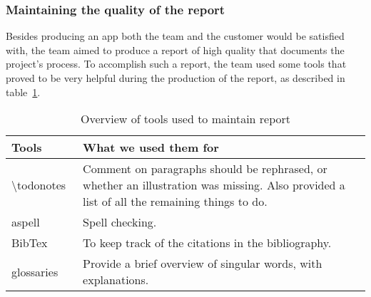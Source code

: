 \subsubsection{Maintaining the quality of the report}
Besides producing an app both the team and the customer would be satisfied with, the team aimed to produce a report of high quality that documents the project's process. To accomplish such a report, the team used some tools that proved to be very helpful during the production of the report, as described in table~\ref{tab:reportTools}.

\begin{table}[H]
\begin{tabular}{|l|p{13cm}|}
\hline
\textbf{Tools} & \textbf{What we used them for}\\\hline
\textbackslash todonotes~\cite{todo}&Comment on paragraphs should be rephrased, or whether an illustration was missing. Also provided a list of all the remaining things to do.\\\hline
aspell~\cite{aspell} & Spell checking.\\\hline
BibTex~\cite{bibtex}&To keep track of the citations in the bibliography.\\\hline
glossaries~\cite{glossaries}& Provide a brief overview of singular words, with explanations.\\\hline
\end{tabular}
\caption{Overview of tools used to maintain report}
\label{tab:reportTools}
\end{table}

\begin{comment}
\subsubsection{\textbackslash todonotes}
Feedback is key when creating a product. The \textbackslash todonotes~\cite{todo} package allowed the team to comment on paragraphs and formulations we wanted to rephrase, whether an illustration was missing, and also gave us a list of all the things we had to do, making it easy to get an overview of the remaining tasks regarding the report.\\

\subsubsection{Spell checking: aspell}
Although manual proofreading cannot be avoided, it is advantageous to have a tool to perform automatic spell checking. Aspell~\cite{aspell} is such a tool.\\

\subsubsection{References and glossary}
To keep track of the citations in the bibliography in the report, we used a LaTeX-package called BibTex~\cite{bibtex}, and for our glossaries, a package called glossaries~\cite{glossaries}.

\end{comment}
